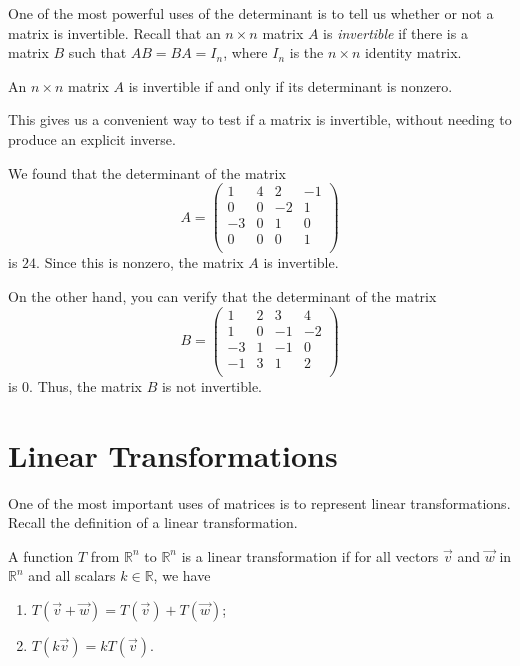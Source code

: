\documentclass{ximera}
\begin{document}
One of the most powerful uses of the determinant is to tell us whether or not a matrix is invertible. Recall that an $n\times n$ matrix $A$ is \emph{invertible} if there is a matrix $B$ such that $AB=BA = I_n$, where $I_n$ is the $n\times n$ identity matrix.

\begin{proposition}
An $n\times n$ matrix $A$ is invertible if and only if its determinant is nonzero.
\end{proposition}

This gives us a convenient way to test if a matrix is invertible, without needing to produce an explicit inverse.

\begin{example}
We found that the determinant of the matrix
\[
A = \left(\begin{array}{cccc}
1 & 4 & 2 & -1\\
0 & 0 & -2 & 1\\
-3 & 0 & 1 & 0\\
0 & 0 & 0 & 1\\
\end{array}\right)
\]
is $24$. Since this is nonzero, the matrix $A$ is invertible.

On the other hand, you can verify that the determinant of the matrix
\[
B = \left(\begin{array}{cccc}
1 & 2 & 3 & 4\\
1 & 0 & -1 & -2\\
-3 & 1 & -1 & 0\\
-1 & 3 & 1 & 2\\
\end{array}\right)
\]
is $0$. Thus, the matrix $B$ is not invertible.
\end{example}

\section{Linear Transformations}

One of the most important uses of matrices is to represent linear transformations. Recall the definition of a linear transformation.

\begin{definition}
A function $T$ from $\mathbb{R}^n$ to $\mathbb{R}^n$ is a linear transformation if for all vectors $\vec{v}$ and $\vec{w}$ in $\mathbb{R}^n$ and all scalars $k\in\mathbb{R}$, we have
\begin{enumerate}
\item $T(\vec{v}+\vec{w}) = T(\vec{v})+T(\vec{w})$;
\item  $T(k\vec{v}) = kT(\vec{v})$.
\end{enumerate}
\end{definition}
\end{document}
